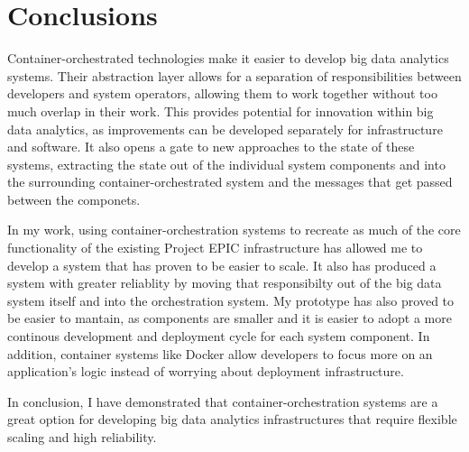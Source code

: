 
\chapter{Conclusions} %

\label{Chapter10} %

Container-orchestrated technologies make it easier to develop big data analytics systems. Their abstraction layer allows for a separation of responsibilities between developers and system operators, allowing them to work together without too much overlap in their work. This provides potential for innovation within big data analytics, as improvements can be developed separately for infrastructure and software. It also opens a gate to new approaches to the state of these systems, extracting the state out of the individual system components and into the surrounding container-orchestrated system and the messages that get passed between the componets.

In my work, using container-orchestration systems to recreate as much of the core functionality of the existing Project EPIC infrastructure has allowed me to develop a system that has proven to be easier to scale. It also has produced a system with greater reliablity by moving that responsibilty out of the big data system itself and into the orchestration system. My prototype has also proved to be easier to mantain, as components are smaller and it is easier to adopt a more continous development and deployment cycle for each system component. In addition, container systems like Docker allow developers to focus more on an application's logic instead of worrying about deployment infrastructure.

In conclusion, I have demonstrated that container-orchestration systems are a great option for developing big data analytics infrastructures that require flexible scaling and high reliability.
